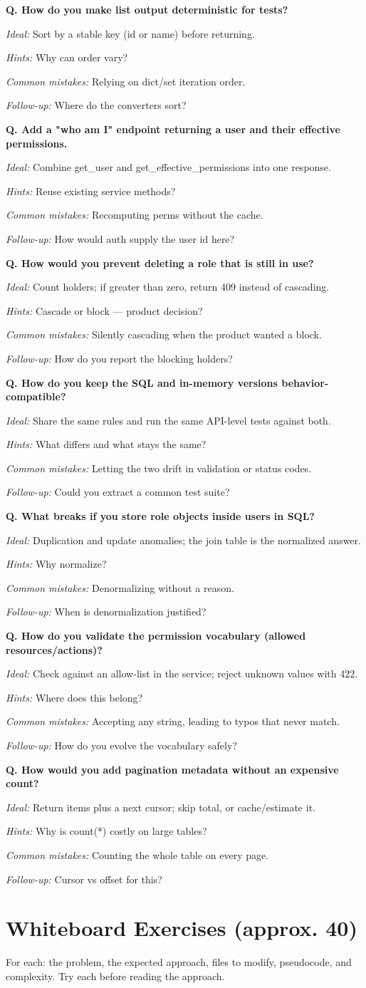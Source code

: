 \documentclass[11pt,a4paper]{report}
\newcommand{\mq}[5]{%
  \par\smallskip\noindent\textbf{Q. #1}\par
  \textit{Ideal:} #2\par
  \textit{Hints:} #3\par
  \textit{Common mistakes:} #4\par
  \textit{Follow-up:} #5\par\smallskip
}
\begin{document}
\mq{How do you make list output deterministic for tests?}
{Sort by a stable key (id or name) before returning.}
{Why can order vary?}
{Relying on dict/set iteration order.}
{Where do the converters sort?}

\mq{Add a "who am I" endpoint returning a user and their effective permissions.}
{Combine get\_user and get\_effective\_permissions into one response.}
{Reuse existing service methods?}
{Recomputing perms without the cache.}
{How would auth supply the user id here?}

\mq{How would you prevent deleting a role that is still in use?}
{Count holders; if greater than zero, return 409 instead of cascading.}
{Cascade or block --- product decision?}
{Silently cascading when the product wanted a block.}
{How do you report the blocking holders?}

\mq{How do you keep the SQL and in-memory versions behavior-compatible?}
{Share the same rules and run the same API-level tests against both.}
{What differs and what stays the same?}
{Letting the two drift in validation or status codes.}
{Could you extract a common test suite?}

\mq{What breaks if you store role objects inside users in SQL?}
{Duplication and update anomalies; the join table is the normalized answer.}
{Why normalize?}
{Denormalizing without a reason.}
{When is denormalization justified?}

\mq{How do you validate the permission vocabulary (allowed resources/actions)?}
{Check against an allow-list in the service; reject unknown values with 422.}
{Where does this belong?}
{Accepting any string, leading to typos that never match.}
{How do you evolve the vocabulary safely?}

\mq{How would you add pagination metadata without an expensive count?}
{Return items plus a next cursor; skip total, or cache/estimate it.}
{Why is count(*) costly on large tables?}
{Counting the whole table on every page.}
{Cursor vs offset for this?}

\chapter{Whiteboard Exercises (approx. 40)}

For each: the problem, the expected approach, files to modify, pseudocode, and
complexity. Try each before reading the approach.
\end{document}
